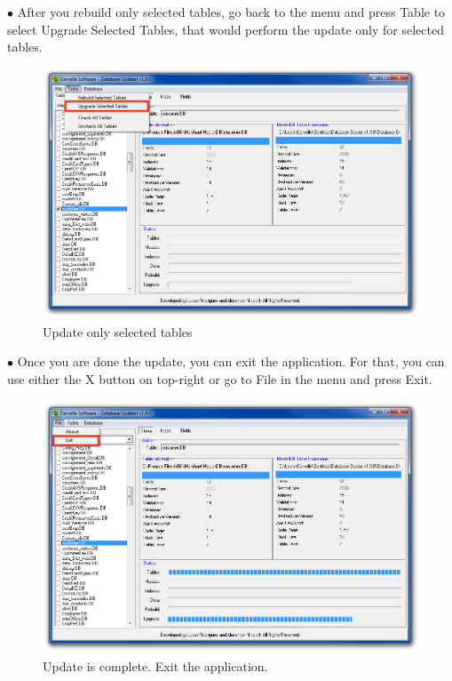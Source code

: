 \documentclass[a4paper, 11pt]{article}
\begin{document}
\pagebreak

\vspace*{\fill}
$\bullet$ After you rebuild only selected tables, go back to the menu and press Table to select Upgrade Selected Tables, that would perform the update only for selected tables. 
\begin{figure}[h]
    \centering
     \includegraphics[width=\textwidth]{capture 36}
    \caption{Update only selected tables}
\end{figure}
\vspace*{\fill}

\pagebreak

\vspace*{\fill}
$\bullet$ Once you are done the update, you can exit the application. For that, you can use either the X button on top-right or go to File in the menu and press Exit.
\begin{figure}[h]
    \centering
     \includegraphics[width=\textwidth]{capture 38}
    \caption{Update is complete. Exit the application.}
\end{figure}
\vspace*{\fill}
\end{document}
